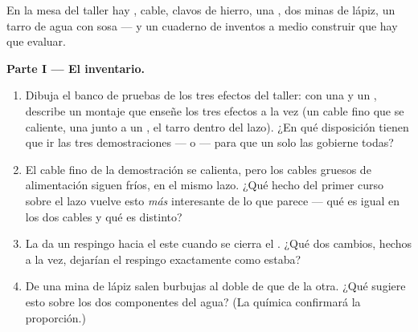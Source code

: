 \begin{problem}\label{pb:g8:electric-current-effects:1}
En la mesa del taller hay , cable, clavos de hierro, una
, dos minas de lápiz, un tarro de agua con sosa --- y un
cuaderno de inventos a medio construir que hay que evaluar.

\medskip\noindent\textbf{Parte I --- El inventario.}
\begin{enumerate}
  \item Dibuja el banco de pruebas de los tres efectos del taller:
        con una  y un , describe un montaje que
        enseñe los tres efectos a la vez (un cable fino que se
        caliente, una  junto a un , el tarro dentro
        del lazo). ¿En qué disposición tienen que ir las tres
        demostraciones ---  o  --- para que un
        solo  las gobierne todas?
  \item El cable fino de la demostración se calienta, pero los
        cables gruesos de alimentación siguen fríos, en el mismo
        lazo. ¿Qué hecho del primer curso sobre el lazo 
        vuelve esto \emph{más} interesante de lo que parece --- qué
        es igual en los dos cables y qué es distinto?
  \item La  da un respingo hacia el este cuando se cierra
        el . ¿Qué dos cambios, hechos a la vez,
        dejarían el respingo exactamente como estaba?
  \item De una mina de lápiz salen burbujas al doble de 
        que de la otra. ¿Qué sugiere esto sobre los dos componentes
        del agua? (La química confirmará la proporción.)
\end{enumerate}


\end{problem}
